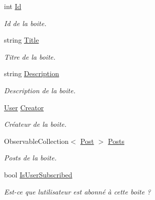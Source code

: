 \begin{DoxyCompactItemize}
int \hyperlink{class_boxes_1_1_view_models_1_1_box_view_model_a21768b16e75b17cae9e7a66a909b4bcd}{Id}
\begin{DoxyCompactList}\small\item\em Id de la boite. \end{DoxyCompactList}\item 
string \hyperlink{class_boxes_1_1_view_models_1_1_box_view_model_a214dac57bd4bc8cc3f05bbfd3da0cd39}{Title}
\begin{DoxyCompactList}\small\item\em Titre de la boite. \end{DoxyCompactList}\item 
string \hyperlink{class_boxes_1_1_view_models_1_1_box_view_model_ade800bd7096f87f32f5089ab1fb631d0}{Description}
\begin{DoxyCompactList}\small\item\em Description de la boite. \end{DoxyCompactList}\item 
\hyperlink{class_boxes_1_1_models_1_1_user}{User} \hyperlink{class_boxes_1_1_view_models_1_1_box_view_model_a99c51cc8242caaf9257c7a4f9b9155b4}{Creator}
\begin{DoxyCompactList}\small\item\em Créateur de la boite. \end{DoxyCompactList}\item 
Observable\+Collection$<$ \hyperlink{class_boxes_1_1_models_1_1_post}{Post} $>$ \hyperlink{class_boxes_1_1_view_models_1_1_box_view_model_a31e87a4628c6c9c8506a71457c042f4d}{Posts}
\begin{DoxyCompactList}\small\item\em Posts de la boite. \end{DoxyCompactList}\item 
bool \hyperlink{class_boxes_1_1_view_models_1_1_box_view_model_afa97dbd579230ac6f500b158f75f8254}{Is\+User\+Subscribed}
\begin{DoxyCompactList}\small\item\em Est-\/ce que l\textquotesingle{}utilisateur est abonné à cette boite ? \end{DoxyCompactList}\item 

\end{DoxyCompactItemize}
